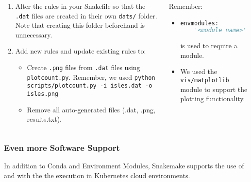\begin{frame}[fragile]
  \frametitle{}
  \begin{columns}
    \begin{column}{0.5\textwidth}
      \begin{enumerate}
   \item Alter the rules in your Snakefile so that the \texttt{.dat} files are created in their own \texttt{dats/} folder. Note that creating this folder beforehand is unnecessary.
   \item Add new rules and update existing rules to:
      \begin{itemize}\footnotesize
       \item Create \texttt{.png} files from \texttt{.dat} files using \texttt{plotcount.py}. Remember, we used \texttt{python scripts/plotcount.py -i isles.dat -o isles.png
}
       \item Remove all auto-generated files (.dat, .png, results.txt).
      \end{itemize}
  \end{enumerate}
    \end{column}
    \begin{column}{0.5\textwidth}
      Remember:
        \begin{itemize}
         \item \begin{lstlisting}[language=Python,style=Python]
  envmodules:
    '<module name>'
               \end{lstlisting} is used to require a module.
        \item We used the \texttt{vis/matplotlib} module to support the plotting functionality.
        \end{itemize}
    \end{column}
  \end{columns}
\end{frame}

\begin{frame}
  \frametitle{Even more Software Support}
  In addition to Conda and Environment Modules, Snakemake supports the use of  and with the the execution in Kubernetes cloud environments.
\end{frame}



